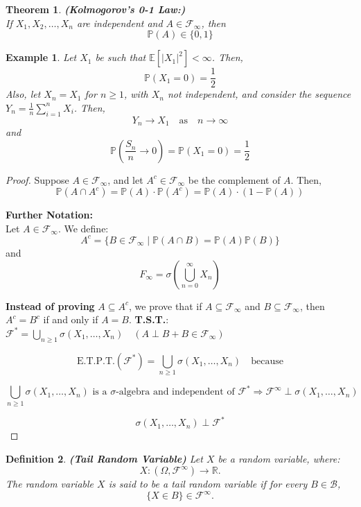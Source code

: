 \documentclass{article}
\newcommand{\1}{\mathds{1}}
\newtheorem{theorem}{Theorem}[section]
\newtheorem{definition}[theorem]{Definition}
\newtheorem{example}{Example}
\begin{document}
\begin{theorem}\textbf{(Kolmogorov's 0-1 Law:)} \\
If \( X_1, X_2, \dots, X_n \) are independent and \( A \in \mathcal{F}_\infty \), then
\[
\mathbb{P}(A) \in \{0, 1\}
\]
\end{theorem}
\begin{example} Let \( X_1 \) be such that \( \mathbb{E}[|X_1|^2] < \infty \). Then,
\[
\mathbb{P}(X_1 = 0) = \frac{1}{2}
\]
Also, let \( X_n = X_1 \) for \( n \geq 1 \), with \( X_n \) not independent, and consider the sequence \( Y_n = \frac{1}{n} \sum_{i=1}^n X_i \). Then,
\[
Y_n \to X_1 \quad \text{as} \quad n \to \infty
\]
and
\[
\mathbb{P}\left( \frac{S_n}{n} \to 0 \right) = \mathbb{P}(X_1 = 0) = \frac{1}{2}
\]
\end{example}
\begin{proof} Suppose \( A \in \mathcal{F}_\infty \), and let \( A^c \in \mathcal{F}_\infty \) be the complement of \( A \). Then,
\[
\mathbb{P}(A \cap A^c) = \mathbb{P}(A) \cdot \mathbb{P}(A^c) = \mathbb{P}(A) \cdot (1 - \mathbb{P}(A))
\]

\noindent\textbf{Further Notation:} \\
Let \( A \in \mathcal{F}_\infty \). We define:
\[
A^c = \{ B \in \mathcal{F}_\infty \mid \mathbb{P}(A \cap B) = \mathbb{P}(A) \mathbb{P}(B) \}
\]
and
\[
F_\infty = \sigma\left( \bigcup_{n=0}^\infty X_n \right)
\]

\textbf{Instead of proving} \( A \subseteq A^c \), we prove that if \( A \subseteq \mathcal{F}_\infty \) and \( B \subseteq \mathcal{F}_\infty \), then \( A^c = B^c \) if and only if \( A = B \).
\textbf{T.S.T.}: \( \mathcal{F}^* = \bigcup_{n \geq 1} \sigma(X_1, \dots, X_n) \quad (A \perp B + B \in \mathcal{F}_\infty) \)

\[
\text{E.T.P.T.}(\mathcal{F}^*) = \bigcup_{n \geq 1} \sigma(X_1, \dots, X_n) \quad \text{because}
\]

\[
\bigcup_{n \geq 1} \sigma(X_1, \dots, X_n) \text{ is a } \sigma\text{-algebra and independent of } \mathcal{F}^* \Rightarrow \mathcal{F}^\infty \perp \sigma(X_1, \dots, X_n)
\]

\[
\sigma(X_1, \dots, X_n) \perp \mathcal{F}^*
\]
\end{proof}
\begin{definition}\textbf{(Tail Random Variable)}
    Let \( X \) be a random variable, where:
\[
X: (\Omega, \mathcal{F}^\infty) \to \mathbb{R}.
\]
The random variable \( X \) is said to be a tail random variable if for every \( B \in \mathcal{B} \),
\[
\{ X \in B \} \in \mathcal{F}^\infty.
\]
\end{definition}
\end{document}
